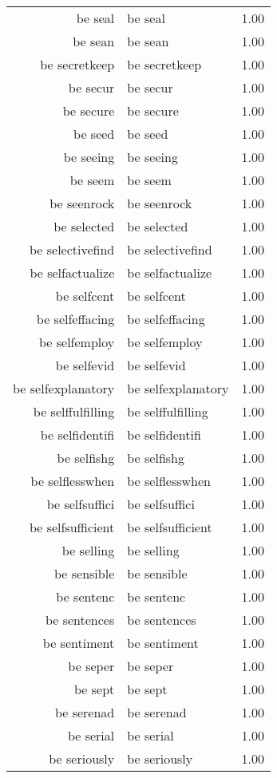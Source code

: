\begin{table}[ht]
\begin{tabular}{rlr}
  be seal & be seal & 1.00 \\ 
  be sean & be sean & 1.00 \\ 
  be secretkeep & be secretkeep & 1.00 \\ 
  be secur & be secur & 1.00 \\ 
  be secure & be secure & 1.00 \\ 
  be seed & be seed & 1.00 \\ 
  be seeing & be seeing & 1.00 \\ 
  be seem & be seem & 1.00 \\ 
  be seenrock & be seenrock & 1.00 \\ 
  be selected & be selected & 1.00 \\ 
  be selectivefind & be selectivefind & 1.00 \\ 
  be selfactualize & be selfactualize & 1.00 \\ 
  be selfcent & be selfcent & 1.00 \\ 
  be selfeffacing & be selfeffacing & 1.00 \\ 
  be selfemploy & be selfemploy & 1.00 \\ 
  be selfevid & be selfevid & 1.00 \\ 
  be selfexplanatory & be selfexplanatory & 1.00 \\ 
  be selffulfilling & be selffulfilling & 1.00 \\ 
  be selfidentifi & be selfidentifi & 1.00 \\ 
  be selfishg & be selfishg & 1.00 \\ 
  be selflesswhen & be selflesswhen & 1.00 \\ 
  be selfsuffici & be selfsuffici & 1.00 \\ 
  be selfsufficient & be selfsufficient & 1.00 \\ 
  be selling & be selling & 1.00 \\ 
  be sensible & be sensible & 1.00 \\ 
  be sentenc & be sentenc & 1.00 \\ 
  be sentences & be sentences & 1.00 \\ 
  be sentiment & be sentiment & 1.00 \\ 
  be seper & be seper & 1.00 \\ 
  be sept & be sept & 1.00 \\ 
  be serenad & be serenad & 1.00 \\ 
  be serial & be serial & 1.00 \\ 
  be seriously & be seriously & 1.00 \\ 

\end{tabular}
\end{table}
